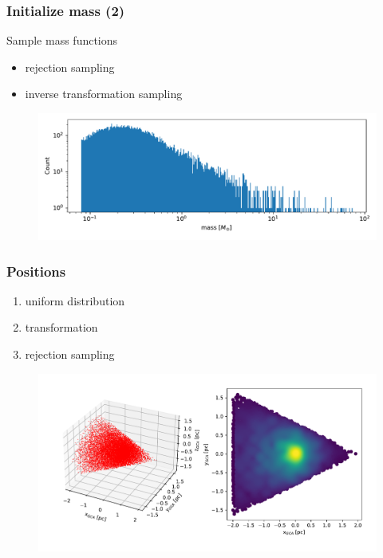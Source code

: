 \documentclass{beamer}
\begin{document}
\begin{frame}
\frametitle{Initialize mass (2)}

Sample mass functions

\begin{itemize}
\item rejection sampling
\item inverse transformation sampling
\end{itemize}

\begin{figure}
\centering
\includegraphics[width=\linewidth]{Images/initial_conditions_mass_bulge.pdf}
\end{figure}

\end{frame}


\begin{frame}
\frametitle{Positions}

\begin{enumerate}
\item uniform distribution
\item transformation
\item rejection sampling
\end{enumerate}

\begin{figure}
\centering
\includegraphics[width=\linewidth]{Images/cone_3D.pdf}
\end{figure}

\end{frame}
\end{document}
